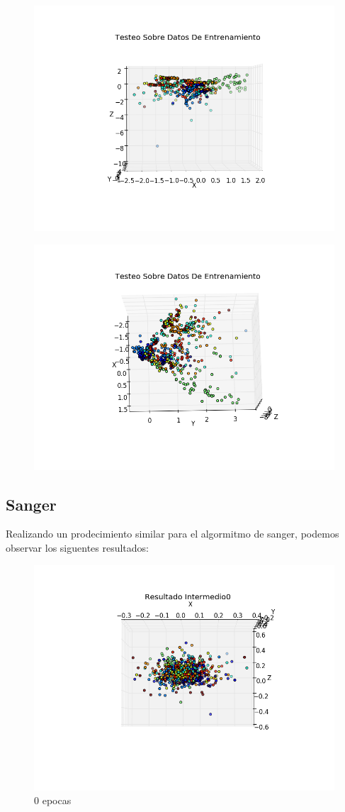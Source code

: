 \begin{figure}[h!]
	\centering
	\includegraphics[width=.6\linewidth]{convergencia_oja/4.png}
	\label{fig:test1}
	\centering
\end{figure}

\begin{figure}[h!]
  \centering
  \includegraphics[width=.6\linewidth]{convergencia_oja/42.png}
  \label{fig:test1}
  \centering
\end{figure}

\pagebreak

\subsection{Sanger}

Realizando un prodecimiento similar para el algormitmo de sanger, podemos observar los siguentes resultados:

\begin{figure}[h!]
  \centering
  \includegraphics[width=.6\linewidth]{convergencia_sanger/0.png}
\caption{0 epocas}
\label{fig:test}
\end{figure}

